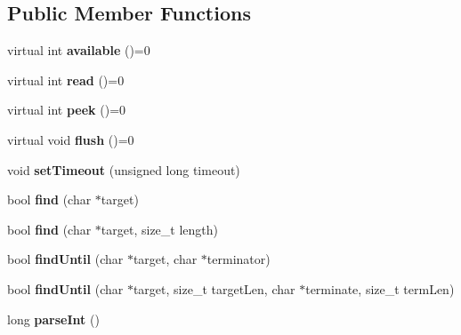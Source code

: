 \subsection*{Public Member Functions}
\begin{DoxyCompactItemize}
\item 
\hypertarget{class_stream_aebd60457902debb30b07971a16f24ebd}{virtual int {\bfseries available} ()=0}\label{class_stream_aebd60457902debb30b07971a16f24ebd}

\item 
\hypertarget{class_stream_a4afd50731ba321d1b9be909cb288a50b}{virtual int {\bfseries read} ()=0}\label{class_stream_a4afd50731ba321d1b9be909cb288a50b}

\item 
\hypertarget{class_stream_a9ae768d427519818aa552adf467bf65a}{virtual int {\bfseries peek} ()=0}\label{class_stream_a9ae768d427519818aa552adf467bf65a}

\item 
\hypertarget{class_stream_a50ab71f4bc571f6e246b20db4b3dd131}{virtual void {\bfseries flush} ()=0}\label{class_stream_a50ab71f4bc571f6e246b20db4b3dd131}

\item 
\hypertarget{class_stream_a76c7d6530b9cb17f6663a64aea84b61e}{void {\bfseries set\-Timeout} (unsigned long timeout)}\label{class_stream_a76c7d6530b9cb17f6663a64aea84b61e}

\item 
\hypertarget{class_stream_a13fd59f691f095fc014b4c012cbd79f7}{bool {\bfseries find} (char $\ast$target)}\label{class_stream_a13fd59f691f095fc014b4c012cbd79f7}

\item 
\hypertarget{class_stream_a064fe7239eb0cc6ba4a41d064d90a51f}{bool {\bfseries find} (char $\ast$target, size\-\_\-t length)}\label{class_stream_a064fe7239eb0cc6ba4a41d064d90a51f}

\item 
\hypertarget{class_stream_ae9bf806705b80571316623814e5cb2ca}{bool {\bfseries find\-Until} (char $\ast$target, char $\ast$terminator)}\label{class_stream_ae9bf806705b80571316623814e5cb2ca}

\item 
\hypertarget{class_stream_a99d1b6ad00abb9264b5ebb7506585993}{bool {\bfseries find\-Until} (char $\ast$target, size\-\_\-t target\-Len, char $\ast$terminate, size\-\_\-t term\-Len)}\label{class_stream_a99d1b6ad00abb9264b5ebb7506585993}

\item 
\hypertarget{class_stream_a4d54d18e24a5aff0faa15f40be995edf}{long {\bfseries parse\-Int} ()}\label{class_stream_a4d54d18e24a5aff0faa15f40be995edf}


\end{DoxyCompactItemize}
